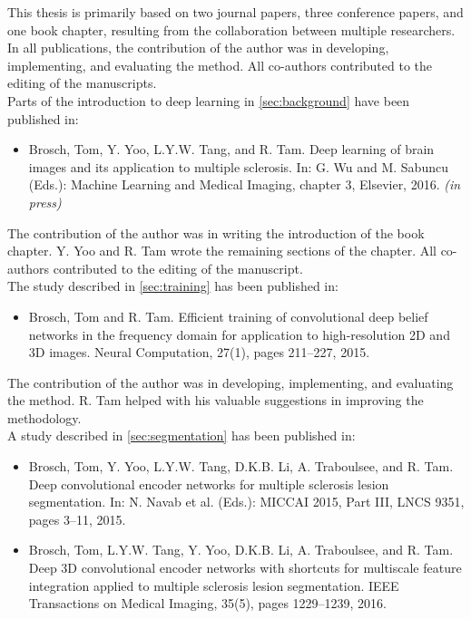 
This thesis is primarily based on two journal papers, three conference
papers, and one book chapter, resulting from the collaboration between multiple
researchers. In all publications, the contribution of the author was in
developing, implementing, and evaluating the method. All co-authors
contributed to the editing of the manuscripts.
\\[1em]
Parts of the introduction to deep learning in \ref{sec:background} have been
published in:
\begin{itemize}
\item Brosch, Tom, Y. Yoo, L.Y.W. Tang, and R. Tam.
Deep learning of brain images and its application to multiple sclerosis.
In: G. Wu and M. Sabuncu (Eds.): Machine Learning and Medical Imaging, chapter 3,
Elsevier, 2016. \emph{(in press)}
\end{itemize}
The contribution of the author was in writing the introduction of the book
chapter. Y. Yoo and R. Tam wrote the remaining sections of the chapter. All
co-authors contributed to the editing of the manuscript.
\\[1em]
The study described in \ref{sec:training} has been published in:
\begin{itemize}
\item Brosch, Tom and R. Tam. Efficient training of convolutional deep
belief networks in the frequency domain for application to high-resolution 2D
and 3D images. Neural Computation, 27(1), pages 211--227, 2015.
\end{itemize}
The contribution of the author was in developing, implementing, and evaluating
the method. R. Tam helped with his valuable suggestions in improving the
methodology.
\\[1em]
A study described in \ref{sec:segmentation} has been published in:
\begin{itemize}
\item Brosch, Tom, Y. Yoo, L.Y.W. Tang, D.K.B. Li, A. Traboulsee, and R. Tam.
Deep convolutional encoder networks for multiple sclerosis lesion segmentation.
In: N. Navab et al. (Eds.): MICCAI 2015, Part III, LNCS 9351, pages 3--11, 2015.
\item Brosch, Tom, L.Y.W. Tang, Y. Yoo, D.K.B. Li, A. Traboulsee, and R. Tam.
Deep 3D convolutional encoder networks with shortcuts for multiscale feature
integration applied to multiple sclerosis lesion segmentation. IEEE Transactions
on Medical Imaging, 35(5), pages 1229--1239, 2016.
\end{itemize}
